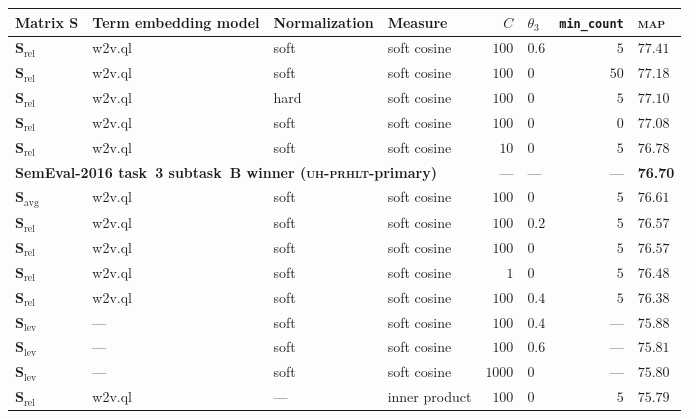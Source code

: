 \documentclass[
  digital, %
  notable, %
  lof,     %
  lot,     %
  nopalatino, color
]{fithesis3}
\newenvironment{liningfigs}{\renewcommand*{\rmdefault}{zpltlf}\normalfont}{}
\newcommand{\op}[1]{\ensuremath{\operatorname{#1}}}
\newcommand{\avg}{\op{avg}}
\def\abbr#1{\textsc{\MakeLowercase{#1}}}
\begin{document}
\begin{table}
\pagestyle{empty}
\index{.savg@$\mathbf S_{\avg}$}
\centering
\begin{liningfigs}
\footnotesize
\begin{tabular}{llllrlrl}
Matrix $\mathbf S$ &
  Term embedding model &
  Normalization &
  Measure &
  $C$ &
  $\theta_3$ &
  \texttt{min\_count} &
  \abbr{MAP}\index{map@\abbr {MAP}} \\ \toprule
$\mathbf S_{\textrm{rel}}$ & w2v.ql & soft & soft cosine & $100$ & $0.6$ & $5$ & $77.41$ \\
$\mathbf S_{\textrm{rel}}$ & w2v.ql & soft & soft cosine & $100$ & $0$ & $50$ & $77.18$ \\
$\mathbf S_{\textrm{rel}}$ & w2v.ql & hard & soft cosine & $100$ & $0$ & $5$ & $77.10$ \\
$\mathbf S_{\textrm{rel}}$ & w2v.ql & soft & soft cosine & $100$ & $0$ & $0$ & $77.08$ \\
$\mathbf S_{\textrm{rel}}$ & w2v.ql & soft & soft cosine & $10$ & $0$ & $5$ & $76.78$ \\
\multicolumn{4}{l}{\bfseries SemEval-2016 task~3 subtask~B winner (\abbr{UH-PRHLT}-primary)} &
  --- &
  --- &
  --- &
  \bfseries76.70 \\
$\mathbf S_{\textrm{avg}}$ & w2v.ql & soft & soft cosine & $100$ & $0$ & $5$ & $76.61$ \\
$\mathbf S_{\textrm{rel}}$ & w2v.ql & soft & soft cosine & $100$ & $0.2$ & $5$ & $76.57$ \\
$\mathbf S_{\textrm{rel}}$ & w2v.ql & soft & soft cosine & $100$ & $0$ & $5$ & $76.57$ \\ %
$\mathbf S_{\textrm{rel}}$ & w2v.ql & soft & soft cosine & $1$ & $0$ & $5$ & $76.48$ \\
$\mathbf S_{\textrm{rel}}$ & w2v.ql & soft & soft cosine & $100$ & $0.4$ & $5$ & $76.38$ \\
$\mathbf S_{\textrm{lev}}$ & --- & soft & soft cosine & $100$ & $0.4$ & --- & $75.88$ \\
$\mathbf S_{\textrm{lev}}$ & --- & soft & soft cosine & $100$ & $0.6$ & --- & $75.81$ \\
$\mathbf S_{\textrm{lev}}$ & --- & soft & soft cosine & $1000$ & $0$ & --- & $75.80$ \\
$\mathbf S_{\textrm{rel}}$ & w2v.ql & --- & inner product & $100$ & $0$ & $5$ & $75.79$ \\

\end{tabular}
\end{liningfigs}
\end{table}
\end{document}
